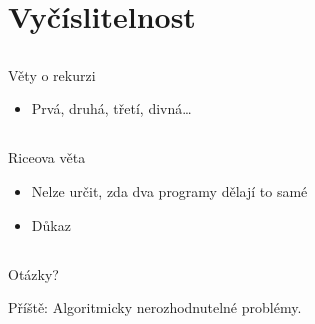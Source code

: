 \documentclass{beamer}
\begin{document}
\section{Vyčíslitelnost}

\subsection{}
\begin{frame}{Věty o rekurzi}
\begin{itemize}
\item Prvá, druhá, třetí, divná\dots
\end{itemize}
\end{frame}

\subsection{}
\begin{frame}{Riceova věta}
\begin{itemize}
\item Nelze určit, zda dva programy dělají to samé
\item Důkaz
\end{itemize}
\end{frame}

\subsection{}
\begin{frame}{Otázky?}
\begin{center}
Příště: Algoritmicky nerozhodnutelné problémy.
\end{center}
\end{frame}

\subsection{}
\end{document}
